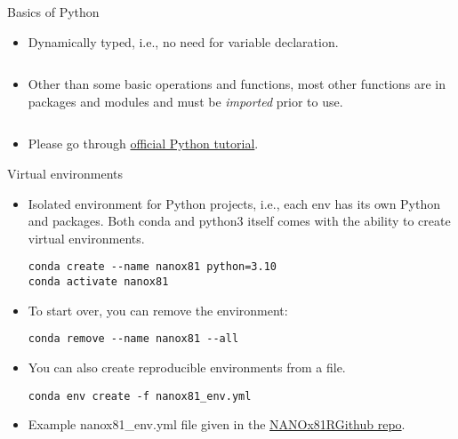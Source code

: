 \documentclass[aspectratio=169]{beamer}
\newcommand{\classname}{NANOx81R}
\begin{document}
    \begin{frame}[fragile]{Basics of Python}
        \begin{itemize}
            \item Dynamically typed, i.e., no need for variable declaration.
            \inputminted{python}{example_basic_python.py}
            \item Other than some basic operations and functions, most other functions are in packages and modules and must be \textit{imported} prior to use.
            \inputminted{python}{example_imports.py}
            \item Please go through \href{https://docs.python.org/3/tutorial/index.html}{official Python tutorial}.
        \end{itemize}
    \end{frame}


    \begin{frame}[fragile]{Virtual environments}
        \begin{itemize}
            \item Isolated environment for Python projects, i.e., each env has its own Python and packages. Both conda and python3 itself comes with the ability to create virtual environments.
            \begin{verbatim}
conda create --name nanox81 python=3.10
conda activate nanox81
            \end{verbatim}
            \item To start over, you can remove the environment:
            \begin{verbatim}
conda remove --name nanox81 --all
            \end{verbatim}
            \item You can also create reproducible environments from a file.
            \begin{verbatim}
conda env create -f nanox81_env.yml
            \end{verbatim}
            \item Example nanox81\_env.yml file given in the \href{https://github.com/materialsvirtuallab/nano281}{\classname Github repo}.
        \end{itemize}
    \end{frame}
\end{document}
